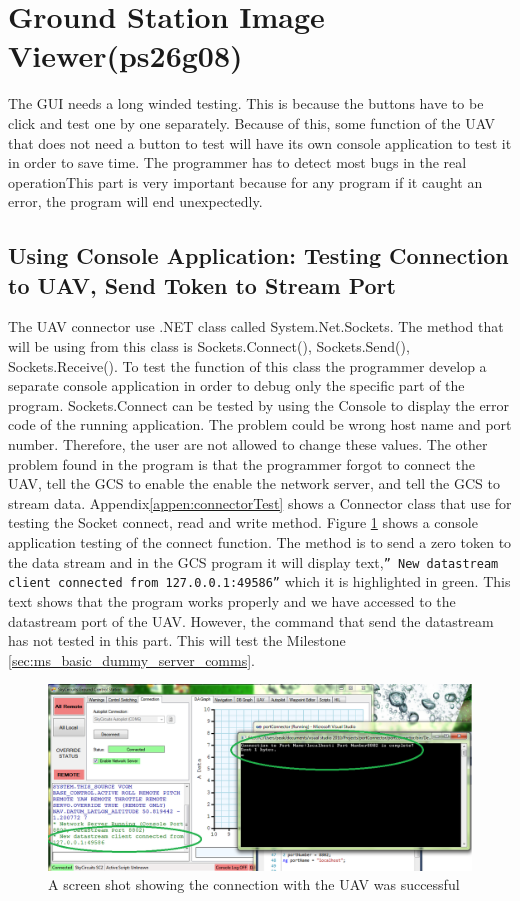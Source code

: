 \section{Ground Station Image Viewer(ps26g08)}
\label{sec:ground_station_image_viewer}
The GUI needs a long winded testing. This is because the buttons have to be click and test one by one separately. Because of this, some function of the UAV that does not need a button to test will have its own console application to test it in order to save time. The programmer has to detect most bugs in the real operationThis part is very important because for any program if it caught an error, the program will end unexpectedly.
\subsection{Using Console Application: Testing Connection to UAV, Send Token to Stream Port}
\label{sec:testing_connection_send_to_stream}
The UAV connector use .NET class called System.Net.Sockets. The method that will be using from this class is Sockets.Connect(), Sockets.Send(), Sockets.Receive(). To test the function of this class the programmer develop a separate console application in order to debug only the specific part of the program. Sockets.Connect can be tested by using the Console to display the error code of the running application. The problem could be wrong host name and port number. Therefore, the user are not allowed to change these values. The other problem found in the program is that the programmer forgot to connect the UAV, tell the GCS to enable the enable the network server, and tell the GCS to stream data. Appendix\ref{appen:connectorTest} shows a Connector class that use for testing the Socket connect, read and write method.
Figure \ref{connect to Stream Port} shows a console application testing of the connect function. 
The method is to send a zero token to the data stream and in the GCS program it will display text,\texttt{''\* New datastream client connected from 127.0.0.1:49586''} which it is highlighted in green. 
This text shows that the program works properly and we have accessed to the datastream port of the UAV.
However, the command that send the datastream has not tested in this part. 
This will test the Milestone \ref{sec:ms_basic_dummy_server_comms}.
\begin{figure}[H]
\begin{center}
\includegraphics[width=1.00\textwidth]{testing_screenshots/test_sending.png} 
\end{center}
\caption{A screen shot showing the connection with the UAV was successful\label{connect to Stream Port}}
\end{figure}

